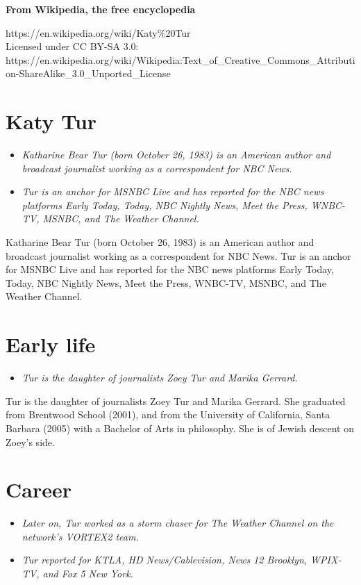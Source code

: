 \textbf{From Wikipedia, the free encyclopedia}

https://en.wikipedia.org/wiki/Katy\%20Tur\\
Licensed under CC BY-SA 3.0:\\
https://en.wikipedia.org/wiki/Wikipedia:Text\_of\_Creative\_Commons\_Attribution-ShareAlike\_3.0\_Unported\_License

\section{Katy Tur}\label{katy-tur}

\begin{itemize}
\item
  \emph{Katharine Bear Tur (born October 26, 1983) is an American author
  and broadcast journalist working as a correspondent for NBC News.}
\item
  \emph{Tur is an anchor for MSNBC Live and has reported for the NBC
  news platforms Early Today, Today, NBC Nightly News, Meet the Press,
  WNBC-TV, MSNBC, and The Weather Channel.}
\end{itemize}

Katharine Bear Tur (born October 26, 1983) is an American author and
broadcast journalist working as a correspondent for NBC News. Tur is an
anchor for MSNBC Live and has reported for the NBC news platforms Early
Today, Today, NBC Nightly News, Meet the Press, WNBC-TV, MSNBC, and The
Weather Channel.

\section{Early life}\label{early-life}

\begin{itemize}
\item
  \emph{Tur is the daughter of journalists Zoey Tur and Marika Gerrard.}
\end{itemize}

Tur is the daughter of journalists Zoey Tur and Marika Gerrard. She
graduated from Brentwood School (2001), and from the University of
California, Santa Barbara (2005) with a Bachelor of Arts in philosophy.
She is of Jewish descent on Zoey's side.

\section{Career}\label{career}

\begin{itemize}
\item
  \emph{Later on, Tur worked as a storm chaser for The Weather Channel
  on the network's VORTEX2 team.}
\item
  \emph{Tur reported for KTLA, HD News/Cablevision, News 12 Brooklyn,
  WPIX-TV, and Fox 5 New York.}
\end{itemize}

